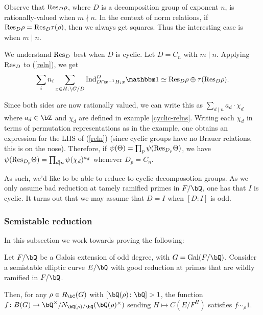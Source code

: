 Observe that $\mathrm{Res}_D\rho$, where $D$ is a decomposition group of exponent $n$, is rationally-valued when $m \nmid n$. In the context of norm relations, if $\mathrm{Res}_D\rho = \mathrm{Res}_D\tau(\rho)$, then we always get squares. Thus the interesting case is when $m \mid n$. 

We understand $\mathrm{Res}_D$ best when $D$ is cyclic. Let $D = C_n$ with $m \mid n$. Applying $\mathrm{Res}_D$ to (\ref{reln}), we get
\begin{equation}\label{reln-resD}
\sum_i n_i \sum_{x \in H_i \backslash G / D} \Ind_{D \cap x^{-1}H_i x}^D \trivial \simeq \Res_D \rho \oplus \tau(\Res_D \rho).
\end{equation}

Since both sides are now rationally valued, we can write this as $\sum_{d \mid n} a_d \cdot \chi_d$ where $a_d \in \bZ$ and $\chi_d$ are defined in example \ref{cyclic-relns}. Writing each $\chi_d$ in terms of permutation representations as in the example, one obtains an expression for the LHS of (\ref{reln}) (since cyclic groups have no Brauer relations, this is on the nose).
Therefore, if $\psi(\Theta) = \prod_p \psi(\mathrm{Res}_{D_p} \Theta)$, we have $\psi(\mathrm{Res}_{D_p} \Theta) = \prod_{d \mid n} \psi(\chi_d)^{a_d}$ whenever $D_p = C_n$.

As such, we'd like to be able to reduce to cyclic decomposotion groups. As we only assume bad reduction at tamely ramified primes in $F / \bQ$, one has that $I$ is cyclic. 
It turns out that we may assume that $D = I$ when $[D \colon I]$ is odd. 



\subsubsection*{Semistable reduction}

In this subsection we work towards proving the following:

\begin{thm}
    Let $F / \bQ$ be a Galois extension of odd degree, with $G = \Gal(F / \bQ)$. 
    Consider a semistable elliptic curve $E / \bQ$ with good reduction at primes that are wildly ramified in $F / \bQ$.
    
    Then, for any $\rho \in R_{\bC}(G)$ with $[\bQ(\rho)\colon \bQ] > 1$, the function $f \colon B(G) \to
    \bQ^{\times} / N_{\bQ(\rho) / \bQ}(\bQ(\rho)^{\times})$ sending $H \mapsto C(E / F^{H})$ satisfies $f \sim_{\rho} 1$.
\end{thm}



